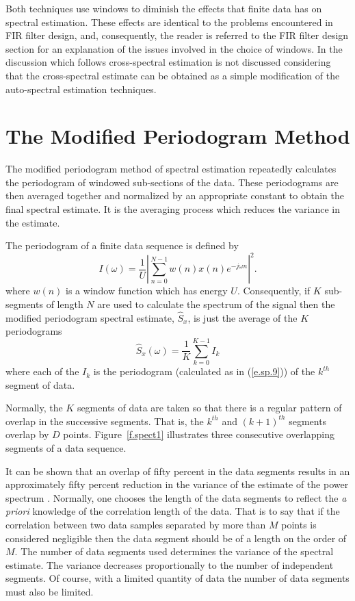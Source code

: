 	Both techniques use windows
to diminish the effects that finite data has on spectral estimation.
These effects are identical to the problems encountered in
FIR filter design, and, consequently, the reader is referred to
the FIR filter design section for an explanation of the
issues involved in the choice of windows.  In the discussion
which follows cross-spectral estimation is not discussed considering
that the cross-spectral estimate can be obtained as a simple
modification of the auto-spectral estimation techniques.

\section{The Modified Periodogram Method}

	The modified periodogram method of spectral estimation
repeatedly calculates the periodogram of windowed sub-sections of the data.
These periodograms are then averaged together and normalized by
an appropriate constant to obtain the final spectral estimate.
It is the averaging process which reduces the variance in the
estimate.

	The periodogram of a finite data sequence is defined by
%
\begin{equation}
I(\omega)=\frac{1}{U}|\sum_{n=0}^{N-1}w(n)x(n)e^{-j\omega n}|^2.
\label{e.sp.9}
\end{equation}
%
where $w(n)$ is a window function which has energy $U$.  Consequently,
if $K$ sub-segments of length $N$ are used to calculate the spectrum
of the signal then the modified periodogram spectral estimate, $\hat{S}_x$,
is just the average of the $K$ periodograms
%
\begin{equation}
\hat{S}_x(\omega)=\frac{1}{K}\sum_{k=0}^{K-1}I_k
\label{e.sp.10}
\end{equation}
%
where each of the $I_k$ is the periodogram (calculated as in (\ref{e.sp.9}))
of the $k^{th}$ segment of data.

	Normally, the $K$ segments of data are taken so that there
is a regular pattern of overlap in the successive segments.  That is,
the $k^{th}$ and $(k+1)^{th}$ segments overlap by $D$ points.
Figure~\ref{f.spect1} illustrates three consecutive
overlapping segments of a data sequence.
%

%
It can be shown that an overlap of fifty percent in the data segments
results in an approximately fifty percent reduction in the variance
of the estimate of the power spectrum \cite{rabiner}.  Normally, one
chooses the length of the data segments to reflect the {\em a priori}
knowledge of the correlation length of the data.  That is to say
that if the correlation between two data samples separated by more than $M$
points is considered negligible then the data segment should be of
a length on the order of $M$.  The number of data segments used determines
the variance of the spectral estimate.  The variance decreases proportionally
to the number of independent segments.  Of course, with a limited
quantity of data the number of data segments must also be limited.

